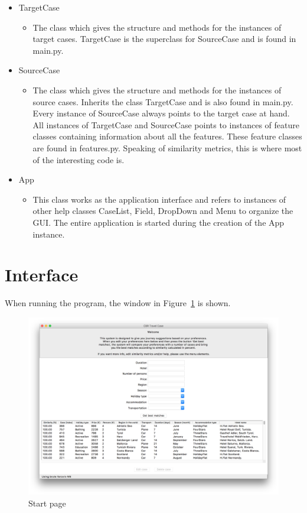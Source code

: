 \documentclass[12pt]{article}
\begin{document}
\begin{itemize}
\item TargetCase
\begin{itemize}
\item The class which gives the structure and methods for the instances of target cases. TargetCase is the superclass for SourceCase and is found in main.py. 
\end{itemize}
\item SourceCase
\begin{itemize}
\item The class which gives the structure and methods for the instances of source cases. Inherits the class TargetCase and is also found in main.py. Every instance of SourceCase always points to the target case at hand. All instances of TargetCase and SourceCase points to instances of feature classes containing information about all the features. These feature classes are found in features.py. Speaking of similarity metrics, this is where most of the interesting code is. 
\end{itemize}
\item App
\begin{itemize}
\item This class works as the application interface and refers to instances of other help classes CaseList, Field, DropDown and Menu to organize the GUI. The entire application is started during the creation of the App instance. 
\end{itemize}
\end{itemize}

\clearpage

\section{Interface}
\label{sec:interface}

When running the program, the window in Figure~\ref{fig:start-page.png} is shown. 

\begin{figure}[h]
\centering
\includegraphics[width=1\textwidth]{start-page.png}
\caption{\label{fig:start-page.png}Start page}
\end{figure}
\end{document}
